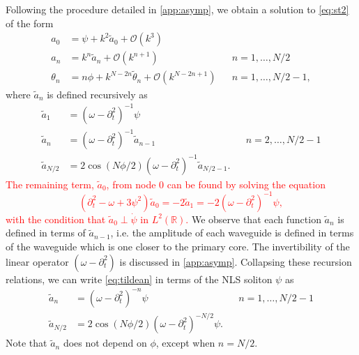 \documentclass[11pt,reqno]{amsart}
\def\R{{\mathbb R}}
\newcommand{\revised}[1]{ \textcolor{red}{#1} }
\begin{document}
Following the procedure detailed in \cref{app:asymp}, we obtain a solution to \cref{eq:st2} of the form
\begin{equation}\label{eq:asympsol}
\begin{aligned}
a_0 &= \psi + k^2 \widetilde{a}_0 + \mathcal{O}(k^3) \\
a_n &= k^n \widetilde{a}_n + \mathcal{O}(k^{n+1}) && n = 1, \dots, N/2 \\
\theta_n &= n \phi + k^{N - 2n} \widetilde{\theta}_n
+ \mathcal{O}(k^{N - 2n+1}) && n = 1, \dots, N/2-1,
\end{aligned}
\end{equation}
where $\widetilde{a}_n$ is defined recursively as 
\begin{equation}\label{eq:tildean}
\begin{aligned}
\widetilde{a}_1 &= (\omega - \partial_t^2)^{-1} \psi \\
\widetilde{a}_n &= (\omega - \partial_t^2)^{-1} \widetilde{a}_{n-1} && n = 2, \dots, N/2-1 \\
\widetilde{a}_{N/2} &= 2 \cos( N\phi/2)(\omega - \partial_t^2)^{-1} \widetilde{a}_{N/2-1}.
\end{aligned}
\end{equation}
\revised{
The remaining term, $\widetilde{a}_0$, from node 0 can be found by solving the equation
\begin{equation}\label{eq:tildea0eq}
\left( \partial_t^2 - \omega + 3 \psi^2 \right) \widetilde{a}_0 = -2 \widetilde{a}_1 =
-2 (\omega - \partial_t^2)^{-1} \psi,
\end{equation}
with the condition that $\widetilde{a}_0 \perp \dot \psi$ in $L^2(\R)$.
}
We observe that each function $\widetilde{a}_n$ is defined in terms of $\widetilde{a}_{n-1}$, i.e. the amplitude of each waveguide is defined in terms of the waveguide which is one closer to the primary core.
The invertibility of the linear operator $(\omega - \partial_t^2)$ is discussed in \cref{app:asymp}. Collapsing these recursion relations, we can write \cref{eq:tildean} in terms of the NLS soliton $\psi$ as
\begin{equation}\label{eq:tildeanpsi}
\begin{aligned}
\widetilde{a}_n &= (\omega - \partial_t^2)^{-n} \psi && n = 1, \dots, N/2-1 \\
\widetilde{a}_{N/2} &= 2 \cos( N\phi/2)(\omega - \partial_t^2)^{-N/2} \psi.
\end{aligned}
\end{equation}
Note that $\widetilde{a}_n$ does not depend on $\phi$, except when $n=N/2$. 
\end{document}

